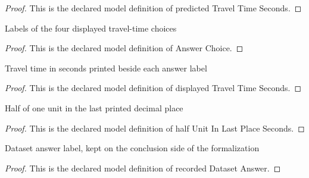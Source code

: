 \begin{proof}
  This is the declared model definition of predicted Travel Time Seconds.
\end{proof}
\begin{definition}
  \label{def:physics:phyx-mini-0993:phyxminiproblems-problemphyxmini0993-answerchoice}
  Labels of the four displayed travel-time choices
\end{definition}
\begin{proof}
  This is the declared model definition of Answer Choice.
\end{proof}
\begin{definition}
  \label{def:physics:phyx-mini-0993:phyxminiproblems-problemphyxmini0993-answerchoice-displayedtraveltimeseconds}
  Travel time in seconds printed beside each answer label
\end{definition}
\begin{proof}
  This is the declared model definition of displayed Travel Time Seconds.
\end{proof}
\begin{definition}
  \label{def:physics:phyx-mini-0993:phyxminiproblems-problemphyxmini0993-answerchoice-halfunitinlastplaceseconds}
  Half of one unit in the last printed decimal place
\end{definition}
\begin{proof}
  This is the declared model definition of half Unit In Last Place Seconds.
\end{proof}
\begin{definition}
  \label{def:physics:phyx-mini-0993:phyxminiproblems-problemphyxmini0993-recordeddatasetanswer}
  Dataset answer label, kept on the conclusion side of the formalization
\end{definition}
\begin{proof}
  This is the declared model definition of recorded Dataset Answer.
\end{proof}
